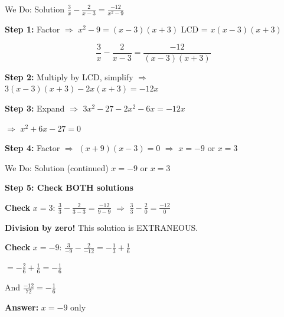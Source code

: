 \documentclass[12pt]{beamer}
\begin{document}
\begin{frame}{We Do: Solution}
$\displaystyle\frac{3}{x} - \frac{2}{x-3} = \frac{-12}{x^2-9}$

\pause
\vspace{0.3cm}

\textbf{Step 1:} Factor $\Rightarrow$ $x^2 - 9 = (x-3)(x+3)$ \quad LCD = $x(x-3)(x+3)$

\pause
$$\frac{3}{x} - \frac{2}{x-3} = \frac{-12}{(x-3)(x+3)}$$

\pause
\vspace{0.3cm}

\textbf{Step 2:} Multiply by LCD, simplify $\Rightarrow$ $3(x-3)(x+3) - 2x(x+3) = -12x$

\pause
\vspace{0.3cm}

\textbf{Step 3:} Expand $\Rightarrow$ $3x^2 - 27 - 2x^2 - 6x = -12x$

\pause
$\Rightarrow$ $x^2 + 6x - 27 = 0$

\pause
\vspace{0.3cm}

\textbf{Step 4:} Factor $\Rightarrow$ $(x + 9)(x - 3) = 0$ \pause $\Rightarrow$ $x = -9$ or $x = 3$
\end{frame}

\begin{frame}{We Do: Solution (continued)}
$x = -9$ or $x = 3$

\pause
\vspace{0.3cm}

\textbf{Step 5: Check BOTH solutions}

\pause
\vspace{0.3cm}

\textbf{Check} $x = 3$: $\displaystyle\frac{3}{3} - \frac{2}{3-3} = \frac{-12}{9-9}$ \pause $\Rightarrow$ $\frac{3}{3} - \frac{2}{0} = \frac{-12}{0}$

\pause
\textbf{Division by zero!} This solution is {\color{red}EXTRANEOUS}.

\pause
\vspace{0.3cm}

\textbf{Check} $x = -9$: $\displaystyle\frac{3}{-9} - \frac{2}{-12} = -\frac{1}{3} + \frac{1}{6}$

\pause
$= -\displaystyle\frac{2}{6} + \frac{1}{6} = -\frac{1}{6}$

\pause
And $\displaystyle\frac{-12}{72} = -\frac{1}{6}$ \checkmark

\pause
\vspace{0.3cm}

\Large \textbf{Answer:} $x = -9$ only
\end{frame}
\end{document}
